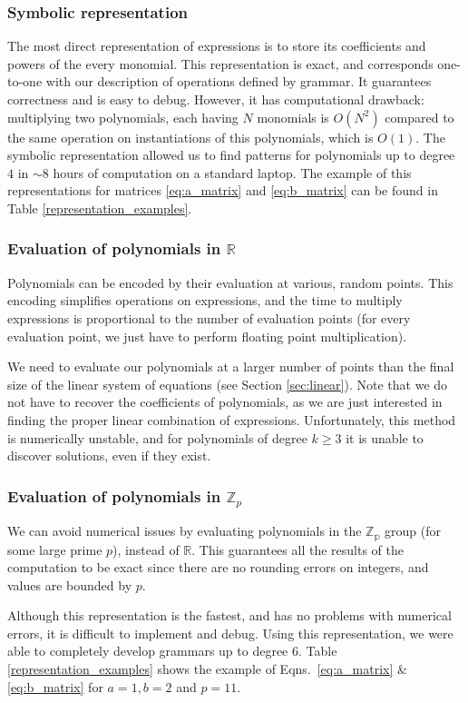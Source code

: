 \subsubsection{Symbolic representation}
The most direct representation of expressions is to store its coefficients and powers of the every monomial.
This representation is exact, and corresponds one-to-one with our description of operations
defined by grammar. It guarantees correctness and is easy to debug. 
However, it has computational drawback: multiplying two polynomials, each having $N$ monomials is $O(N^2)$ compared to the same operation on instantiations of this polynomials, which is $O(1)$.
The symbolic representation allowed us
to find patterns for polynomials up to degree $4$ in $\sim 8$ hours of computation on a standard laptop. 
The example of this representations for matrices \ref{eq:a_matrix} and \ref{eq:b_matrix} can be found
in Table \ref{representation_examples}.

\subsubsection{Evaluation of polynomials in $\mathbb{R}$}
Polynomials can be encoded by their evaluation at various, random points.
This encoding simplifies operations on expressions, and the time to multiply expressions
is proportional to the number of evaluation points (for every evaluation
point, we just have to perform floating point multiplication).

We need to evaluate our polynomials at a larger number of points than
the final size of the linear system of equations (see Section
\ref{sec:linear}). Note that we do not have to recover the
coefficients of polynomials, as we are just interested in finding the
proper linear combination of expressions.  Unfortunately, this method
is numerically unstable, and for polynomials of degree $k \geq 3$ it
is unable to discover solutions, even if they exist.

\subsubsection{Evaluation of polynomials in $\mathbb{Z}_p$}
We can avoid numerical issues by evaluating polynomials in the
$\mathbb{Z_p}$ group (for some large prime $p$), instead of
$\mathbb{R}$. This guarantees all the results of the computation
to be exact since there are no rounding errors on integers, and values are
bounded by $p$.

Although this representation is the fastest, and has no problems with
numerical errors, it is difficult to implement and debug. Using this
representation, we were able to completely develop grammars up to 
degree $6$. Table \ref{representation_examples} shows the example
of Eqns.~\ref{eq:a_matrix} \& \ref{eq:b_matrix} for $a = 1, b = 2$ and $p = 11$.

